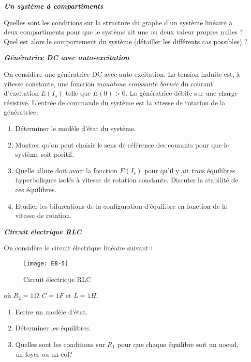 {\begin{exercice} {\bf \em Un système à compartiments}

Quelles sont les conditions sur la structure du graphe d'un
système linéaire à deux compartiments pour que le système ait
une ou deux valeur propres nulles ? Quel est alors le comportement du
système (détailler les différents cas possibles) ?
\end{exercice}
\vv

\begin{exercice}{\bf \em Génératrice DC avec auto-excitation}

On considère une génératrice DC avec auto-excitation. La tension induite est, à vitesse constante, une fonction {\em monotone
croissante bornée} du courant d'excitation $E(I_s)$ telle que $E(0) >
0$. La génératrice débite sur une charge résistive. L'entrée de
commande du système est la vitesse de rotation de la
génératrice.
\begin{enumerate}
\item Déterminer le modèle d'état du système.
\item Montrer qu'on peut choisir le sens de référence des courants pour que le système soit positif.
\item Quelle allure doit avoir la fonction $E(I_s)$ pour qu'il y ait trois
équilibres hyperboliques isolés à vitesse de rotation constante. Discuter la
stabilité de ces équilibres.
\item Etudier les bifurcations de la configuration d'équilibre en fonction de la vitesse de rotation.
\end{enumerate}
\end{exercice}
\vv

\begin{exercice} {\bf \em Circuit électrique RLC} 

On considère le circuit électrique linéaire suivant :
\begin{figure}[h] 
   \centering
   \texttt{[image: E8-5]} 
   \caption{Circuit électrique RLC}
   \label{fig:E8-5}
\end{figure}

où $R_2 = 1\Omega, C = 1F$ et $L = 1H$.

\begin{enumerate}
\item Ecrire un modèle d'état.
\item Déterminer les équilibres.
\item Quelles sont les conditions sur $R_1$ pour que chaque équilibre soit un
noeud, un foyer ou un col?
\end{enumerate}


\end{exercice}}
